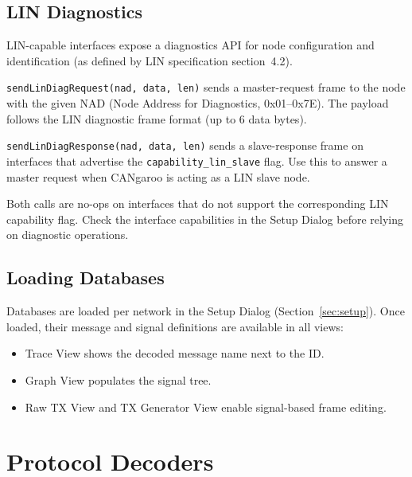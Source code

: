 \documentclass[a4paper,11pt]{article}
\begin{document}
\subsection{LIN Diagnostics}

LIN-capable interfaces expose a diagnostics API for node configuration and
identification (as defined by LIN specification section~4.2).

\begin{description}[leftmargin=2em, style=nextline]
  \item[Diagnostic Request (master)]
    \texttt{sendLinDiagRequest(nad, data, len)} sends a master-request frame
    to the node with the given NAD (Node Address for Diagnostics, 0x01--0x7E).
    The payload follows the LIN diagnostic frame format (up to 6 data bytes).

  \item[Diagnostic Response (slave)]
    \texttt{sendLinDiagResponse(nad, data, len)} sends a slave-response frame
    on interfaces that advertise the \texttt{capability\_lin\_slave} flag.
    Use this to answer a master request when CANgaroo is acting as a LIN slave node.
\end{description}

\begin{notebox}
Both calls are no-ops on interfaces that do not support the corresponding
LIN capability flag. Check the interface capabilities in the Setup Dialog
before relying on diagnostic operations.
\end{notebox}

\subsection{Loading Databases}

Databases are loaded per network in the Setup Dialog (Section~\ref{sec:setup}).
Once loaded, their message and signal definitions are available in all views:

\begin{itemize}
  \item Trace View shows the decoded message name next to the ID.
  \item Graph View populates the signal tree.
  \item Raw TX View and TX Generator View enable signal-based frame editing.
\end{itemize}

\section{Protocol Decoders}
\end{document}
